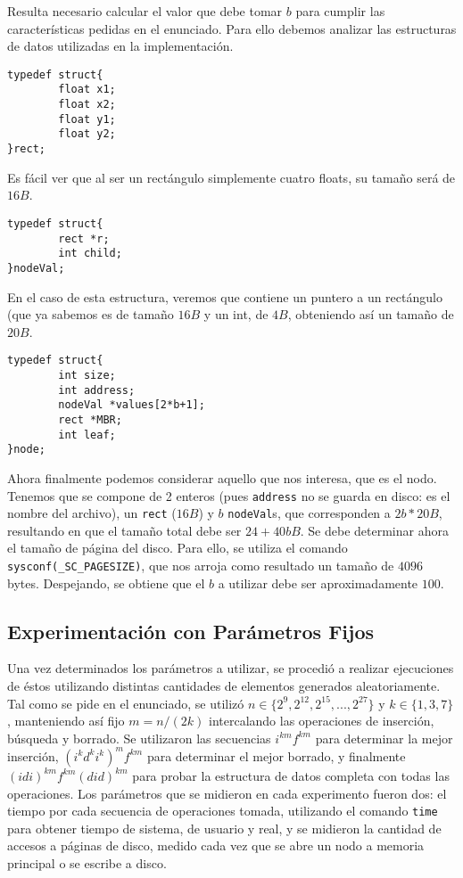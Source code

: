 \documentclass[12pt,spanish]{article}
\begin{document}
Resulta necesario calcular el valor que debe tomar $b$ para cumplir las caracter\'isticas pedidas en el enunciado. Para ello debemos analizar las estructuras de datos utilizadas en la implementaci\'on.
\begin{verbatim}
typedef struct{
        float x1;
        float x2;
        float y1;
        float y2;
}rect;
\end{verbatim}

Es f\'acil ver que al ser un rect\'angulo simplemente cuatro floats, su tama\~no ser\'a de $16B$.
\begin{verbatim}
typedef struct{
        rect *r;
        int child;
}nodeVal;
\end{verbatim}

En el caso de esta estructura, veremos que contiene un puntero a un rect\'angulo (que ya sabemos es de tama\~no $16B$ y un int, de $4B$, obteniendo as\'i un tama\~no de $20B$. 
\begin{verbatim}
typedef struct{
        int size;
        int address;
        nodeVal *values[2*b+1];
        rect *MBR;
        int leaf;
}node;
\end{verbatim}

Ahora finalmente podemos considerar aquello que nos interesa, que es el nodo. Tenemos que se compone de 2 enteros (pues \texttt{address} no se guarda en disco: es el nombre del archivo), un \texttt{rect} ($16B$) y $b$ \texttt{nodeVal}s, que corresponden a $2b*20B$, resultando en que el tama\~no total debe ser $24 + 40bB$.
Se debe determinar ahora el tama\~no de p\'agina del disco. Para ello, se utiliza el comando \texttt{sysconf(\_SC\_PAGESIZE)}, que nos arroja como resultado un tama\~no de $4096$ bytes.
Despejando, se obtiene que el $b$ a utilizar debe ser aproximadamente $100$.

\subsection{Experimentaci\'on con Par\'ametros Fijos}
Una vez determinados los par\'ametros a utilizar, se procedi\'o a realizar ejecuciones de \'estos utilizando distintas cantidades de elementos generados aleatoriamente. Tal como se pide en el enunciado, se utiliz\'o $n \in \{2^9, 2^{12}, 2^{15},...,2^{27}\}$ y $k \in \{1,3,7\}$, manteniendo as\'i fijo $m = n/(2k)$ intercalando las operaciones de inserci\'on, b\'usqueda y borrado. Se utilizaron las secuencias $i^{km}f^{km}$ para determinar la mejor inserci\'on, $(i^kd^ki^k)^mf^{km}$ para determinar el mejor borrado, y finalmente $(idi)^{km}f^{km}(did)^{km}$ para probar la estructura de datos completa con todas las operaciones.
Los par\'ametros que se midieron en cada experimento fueron dos: el tiempo por cada secuencia de operaciones tomada, utilizando el comando \texttt{time} para obtener tiempo de sistema, de usuario y real, y se midieron la cantidad de accesos a p\'aginas de disco, medido cada vez que se abre un nodo a memoria principal o se escribe a disco.
\end{document}
